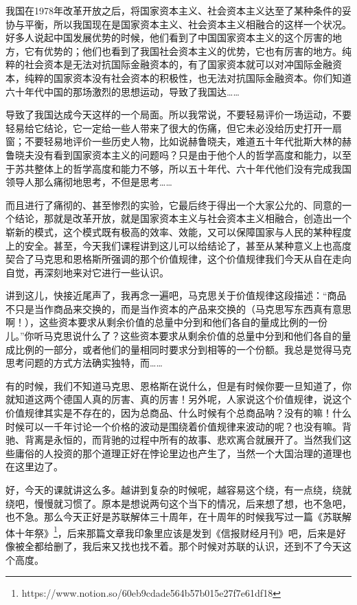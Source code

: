 \documentclass[UTF8, 12pt, a4paper]{ctexrep}
\begin{document}
我国在1978年改革开放之后，将国家资本主义、社会资本主义达至了某种条件的妥协与平衡，所以我国现在是国家资本主义、社会资本主义相融合的这样一个状况。好多人说起中国发展优势的时候，他们看到了中国国家资本主义的这个厉害的地方，它有优势的；他们也看到了我国社会资本主义的优势，它也有厉害的地方。纯粹的社会资本是无法对抗国际金融资本的，有了国家资本就可以对冲国际金融资本，纯粹的国家资本没有社会资本的积极性，也无法对抗国际金融资本。你们知道六十年代中国的那场激烈的思想运动，导致了我国达……

导致了我国达成今天这样的一个局面。所以我常说，不要轻易评价一场运动，不要轻易给它结论，它一定给一些人带来了很大的伤痛，但它未必没给历史打开一扇窗；不要轻易地评价一些历史人物，比如说赫鲁晓夫，难道五十年代批斯大林的赫鲁晓夫没有看到国家资本主义的问题吗？只是由于他个人的哲学高度和能力，以至于苏共整体上的哲学高度和能力不够，所以五十年代、六十年代他们没有完成我国领导人那么痛彻地思考，不但是思考……

而且进行了痛彻的、甚至惨烈的实验，它最后终于得出一个大家公允的、同意的一个结论，那就是改革开放，就是国家资本主义与社会资本主义相融合，创造出一个崭新的模式，这个模式既有极高的效率、效能，又可以保障国家与人民的某种程度上的安全。甚至，今天我们课程讲到这儿可以给结论了，甚至从某种意义上也高度契合了马克思和恩格斯所强调的那个价值规律，这个价值规律我们今天从自在走向自觉，再深刻地来对它进行一些认识。

讲到这儿，快接近尾声了，我再念一遍吧，马克思关于价值规律这段描述：“商品不只是当作商品来交换的，而是当作资本的产品来交换的（马克思写东西真有意思啊！），这些资本要求从剩余价值的总量中分到和他们各自的量成比例的一份儿。”你听马克思说什么了？这些资本要求从剩余价值的总量中分到和他们各自的量成比例的一部分，或者他们的量相同时要求分到相等的一个份额。我总是觉得马克思考问题的方式方法确实独特，而……

有的时候，我们不知道马克思、恩格斯在说什么，但是有时候你要一旦知道了，你就知道这两个德国人真的厉害、真的厉害！另外呢，人家说这个价值规律，说这个价值规律其实是不存在的，因为总商品、什么时候有个总商品呐？没有的嘛！什么时候可以一千年讨论一个价格的波动是围绕着价值规律来波动的呢？也没有嘛。背驰、背离是永恒的，而背驰的过程中所有的故事、悲欢离合就展开了。当然我们这些庸俗的人投资的那个道理正好在悖论里边也产生了，当然一个大国治理的道理也在这里边了。

好，今天的课就讲这么多。越讲到复杂的时候呢，越容易这个绕，有一点绕，绕就绕吧，慢慢就习惯了。原本是想说两句这个当下的情况，后来想了想，也不急吧，也不急。那么今天正好是苏联解体三十周年，在十周年的时候我写过一篇《苏联解体十年祭》\footnote{https://www.notion.so/60eb9cdade564b57b015e27f7e61df18}，后来那篇文章我印象里应该是发到《信报财经月刊》吧，后来是好像被全都给删了，我后来又找也找不着。那个时候对苏联的认识，还到不了今天这个高度。
\end{document}
